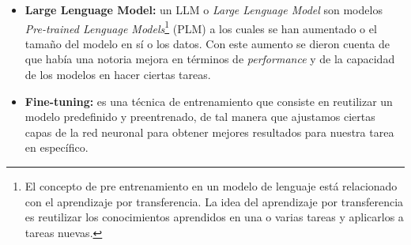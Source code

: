 \begin{itemize}
    \item \textbf{Large Lenguage Model:} un LLM o \textit{Large Lenguage Model} son 
        modelos \textit{Pre-trained Lenguage Models}\footnote{El concepto de pre
        entrenamiento en un modelo de lenguaje está relacionado con el aprendizaje
        por transferencia. La idea del aprendizaje por transferencia es reutilizar
        los conocimientos aprendidos en una o varias tareas y aplicarlos a tareas
        nuevas.} (PLM) a los cuales se han aumentado o el tamaño del modelo en sí
        o los datos. Con este aumento se dieron cuenta de que había una notoria mejora
        en términos de \textit{performance} y de la capacidad de los modelos en hacer
        ciertas tareas. \cite{ZhaoWayneXin2023ASoL}
    \item \textbf{Fine-tuning:} es una técnica de entrenamiento que consiste en
        reutilizar un modelo predefinido y preentrenado, de tal manera que ajustamos
        ciertas capas de la red neuronal para obtener mejores resultados para nuestra
        tarea en específico.
\end{itemize}